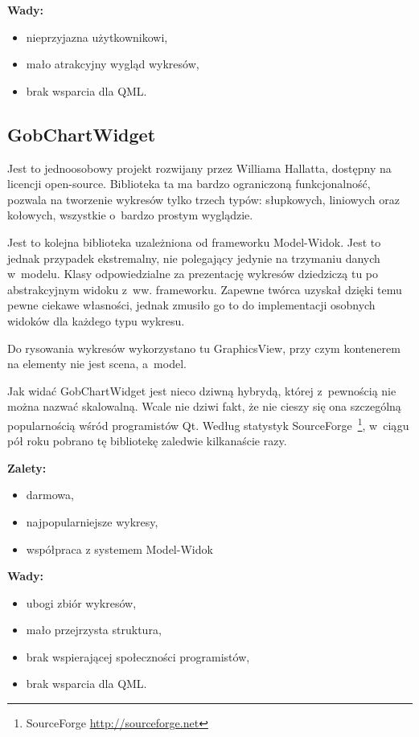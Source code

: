 \textbf{Wady:}
\begin{itemize}
\item{nieprzyjazna użytkownikowi,}
\item{mało atrakcyjny wygląd wykresów,}
\item{brak wsparcia dla QML.}
\end{itemize}

\subsection{GobChartWidget}
Jest to jednoosobowy projekt rozwijany przez Williama Hallatta, dostępny na licencji open-source. Biblioteka ta ma bardzo ograniczoną funkcjonalność, pozwala na tworzenie wykresów tylko trzech typów: słupkowych, liniowych oraz kołowych, wszystkie o~bardzo prostym wyglądzie.\newline

Jest to kolejna biblioteka uzależniona od frameworku Model-Widok. Jest to jednak przypadek ekstremalny, nie polegający jedynie na trzymaniu danych w~modelu. Klasy odpowiedzialne za prezentację wykresów dziedziczą tu po abstrakcyjnym widoku z~ww. frameworku. Zapewne twórca uzyskał dzięki temu pewne ciekawe własności, jednak zmusiło go to do implementacji osobnych widoków dla każdego typu wykresu.\newline

Do rysowania wykresów wykorzystano tu GraphicsView, przy czym kontenerem na elementy nie jest scena, a~model.\newline

Jak widać GobChartWidget jest nieco dziwną hybrydą, której z~pewnością nie można nazwać skalowalną. Wcale nie dziwi fakt, że nie cieszy się ona szczególną popularnością wśród programistów Qt. Według statystyk SourceForge~\footnote{SourceForge \url{http://sourceforge.net}}, w~ciągu pół roku pobrano tę bibliotekę zaledwie kilkanaście razy.

\textbf{Zalety:}
\begin{itemize}
\item{darmowa,}
\item{najpopularniejsze wykresy,}
\item{współpraca z systemem Model-Widok}\newline
\end{itemize}

\textbf{Wady:}
\begin{itemize}
\item{ubogi zbiór wykresów,}
\item{mało przejrzysta struktura,}
\item{brak wspierającej społeczności programistów,}
\item{brak wsparcia dla QML.}
\end{itemize}



